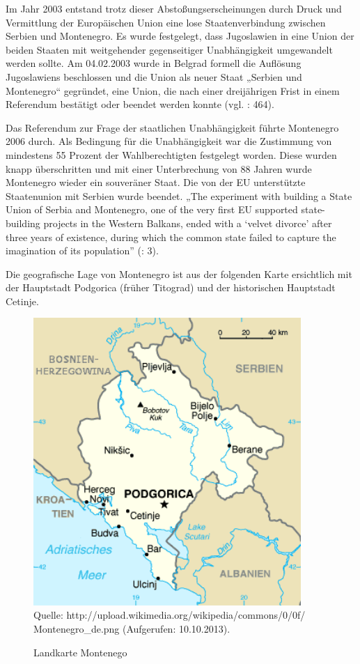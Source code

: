 Im Jahr 2003 entstand trotz dieser Abstoßungserscheinungen durch Druck und Vermittlung der Europäischen Union eine lose Staatenverbindung zwischen Serbien und Montenegro. Es wurde festgelegt, dass Jugoslawien in eine Union der beiden Staaten mit weitgehender gegenseitiger Unabhängigkeit umgewandelt werden sollte. Am 04.02.2003 wurde in Belgrad formell die Auflösung Jugoslawiens beschlossen und die Union als neuer Staat „Serbien und Montenegro“ gegründet, eine Union, die nach einer dreijährigen Frist in einem Referendum bestätigt oder beendet werden konnte (vgl. \cite{hoenehhol}: 464).\par
Das Referendum zur Frage der staatlichen Unabhängigkeit führte Montenegro 2006 durch. Als Bedingung für die Unabhängigkeit war die Zustimmung von mindestens 55 Prozent der Wahlberechtigten festgelegt worden. Diese wurden knapp überschritten und mit einer Unterbrechung von 88 Jahren wurde Montenegro wieder ein souveräner Staat. Die von der EU unterstützte Staatenunion mit Serbien wurde beendet. „The experiment with building a State Union of Serbia and Montenegro, one of the very first EU supported state-building projects in the Western Balkans, ended with a ‘velvet divorce’ after three years of existence, during which the common state failed to capture the imagination of its population” (\cite{noutcheva}: 3).\par
Die geografische Lage von Montenegro ist aus der folgenden Karte ersichtlich mit der Hauptstadt Podgorica (früher Titograd) und der historischen Hauptstadt Cetinje.
\begin{figure}[H]

  \centering
   \caption{Landkarte Montenego}
  \includegraphics[width=4in]{Material/Montenegro_de}\\
 Quelle: http://upload.wikimedia.org/wikipedia/commons/0/0f/\\
Montenegro\_de.png (Aufgerufen: 10.10.2013).
\end{figure}


